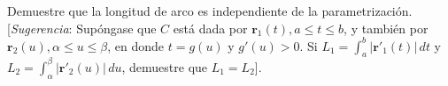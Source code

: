 \item Demuestre que la longitud de arco es independiente de la parametrización. [\textit{Sugerencia}: Supóngase que $C$ está dada por $\mathbf{r}_1(t), a \leq t \leq b$, y también por $\mathbf{r}_2(u), \alpha \leq u \leq \beta$, en donde $t = g(u)$ y $g'(u) > 0$. Si $L_1 = \int_a^b |\mathbf{r}'_1(t)| \, dt$ y $L_2 = \int_\alpha^\beta |\mathbf{r}'_2(u)| \, du$, demuestre que $L_1 = L_2$].
